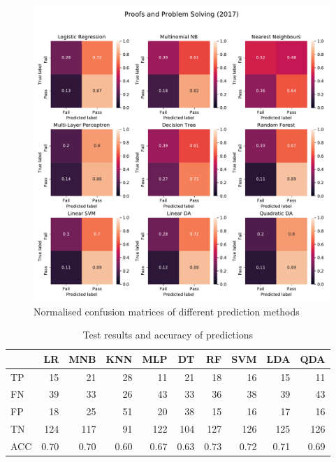 \documentclass[a4paper]{report}
\begin{document}
\begin{figure}[H]
  \centering
  \includegraphics[width=\linewidth]{fig/ML_PPS_bin_17.pdf}
  \caption{\label{fig:ML_PPS_bin_17}Normalised confusion matrices of different prediction methods}
\end{figure}

\begin{table}[H]
  \centering
  \begin{tabular}{lrrrrrrrrr}
    \toprule
    {} &   LR &  MNB &  KNN &  MLP &   DT &   RF &  SVM &  LDA &  QDA \\
    \midrule
    TP  &   15 &   21 &   28 &   11 &   21 &   18 &   16 &   15 &   11 \\
    FN  &   39 &   33 &   26 &   43 &   33 &   36 &   38 &   39 &   43 \\
    FP  &   18 &   25 &   51 &   20 &   38 &   15 &   16 &   17 &   16 \\
    TN  &  124 &  117 &   91 &  122 &  104 &  127 &  126 &  125 &  126 \\
    ACC & 0.70 & 0.70 & 0.60 & 0.67 & 0.63 & 0.73 & 0.72 & 0.71 & 0.69 \\
    \bottomrule
  \end{tabular}
  \caption{\label{tab:ML_PPS_bin_17}Test results and accuracy of predictions}
\end{table}
\end{document}
